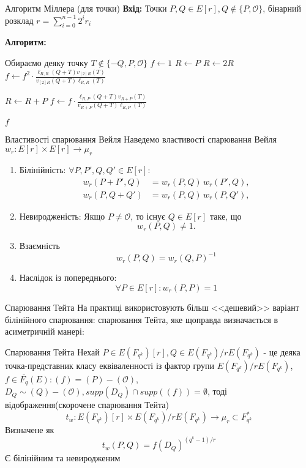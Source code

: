 \documentclass[9pt]{beamer}
\begin{document}
\begin{darkframes}
\begin{frame}{Алгоритм Міллера (для точки)}
\textbf{Вхід:} Точки $P,Q\in E[r],  Q \notin \{P,\mathcal{O}\}$, бінарний розклад $r=\sum_{i=0}^{n-1} 2^i r_i$

\textbf{Алгоритм:}
\begin{algorithmic}[1]
\State Обираємо деяку точку $T\notin \{-Q,P,\mathcal{O}\}$
  \State \(f \gets 1\)
  \State \(R \gets P\)
    \State \(R \gets 2R\)
    \State \(f \gets f^2 \cdot \frac{\ell_{R, R}(Q+T) v_{[2]R}(T)}{v_{[2]R}(Q+T) \ell_{R, R}(T)} \) 
    
    \State \(R \gets R + P\)
      \State \(f \gets f \cdot \frac{\ell_{R, P}(Q+T) v_{R+P}(T)}{v_{R+P}(Q+T) \ell_{R, P}(T)}\) 
      
    \EndIf
  \EndFor
  \State \Return \(f\)
\end{algorithmic}

\end{frame}

\begin{frame}{Властивості спарювання Вейля}
  Наведемо властивості спарювання Вейля $w_r: E[r] \times E[r] \to \mu_r$
  \begin{enumerate}
      \item Білінійність: \(\forall P,P',Q,Q'\in E[r]\):
      $$
       \begin{aligned}
  w_r(P+P', Q) &= w_r(P, Q)\,w_r(P', Q),\\[1mm]
  w_r(P, Q+Q') &= w_r(P, Q)\,w_r(P, Q'),
  \end{aligned}
  $$
  \item Невиродженість: Якщо \(P\neq\mathcal{O}\), то існує \(Q\in E[r]\) таке, що
  \[
  w_r(P, Q)\neq 1.
  \]
  \item Взаємність $$w_r(P,Q)=w_r(Q,P)^{-1}$$
  \item Наслідок із попереднього: $$\forall P\in E[r]: w_r(P,P)=1$$
  \end{enumerate}

  
  

\end{frame}

\begin{frame}{Спарювання Тейта}
    На практиці використовують більш <<дешевий>> варіант білінійного спарювання: спарювання Тейта, яке щоправда визначається в асиметричній манері:
    \begin{block}{Спарювання Тейта}
        Нехай $P \in E(F_{q^k})[r], Q\in E(F_{q^k})/rE(F_{q^k})$ - це деяка точка-представник класу еквіваленності із фактор групи $E(F_{q^k})/rE(F_{q^k})$, $f\in \overline{F_q}(E): (f) = (P) - (\mathcal{O})$, $D_Q \sim (Q)-(\mathcal{O}), supp(D_Q) \cap supp((f))=\emptyset$, тоді відображення(скорочене спарювання Тейта) 
        $$t_w:E(F_{q^k})[r] \times E(F_{q^k})/rE(F_{q^k}) \to \mu_r \subset F^*_{q^k}$$
        Визначене як $$ t_w(P,Q) = f(D_Q)^{(q^k-1)/r} $$
        Є білінійним та невиродженим
    \end{block}
\end{frame}
  \end{darkframes}
\end{document}

